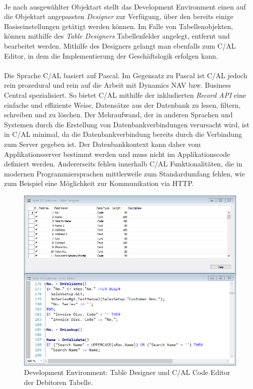 \paragraph{}
Je nach ausgewählter Objektart stellt das Development Environment einen auf die Objektart angepassten \textit{Designer} zur Verfügung, über den bereits einige Basiseinstellungen getätigt werden können. Im Falle von Tabellenobjekten, können mithilfe des \textit{Table Designers} Tabellenfelder angelegt, entfernt und bearbeitet werden. Mithilfe des Designers gelangt man ebenfalls zum C/AL Editor, in dem die Implementierung der Geschäftslogik erfolgen kann.


\paragraph{}
Die Sprache C/AL basiert auf Pascal. Im Gegensatz zu Pascal ist C/AL jedoch rein prozedural und rein auf die Arbeit mit Dynamics NAV bzw. Business Central spezialisiert. So bietet C/AL mithilfe der inkludierten \textit{Record API} eine einfache und effiziente Weise, Datensätze aus der Datenbank zu lesen, filtern, schreiben und zu löschen. Der Mehraufwand, der in anderen Sprachen und Systemen durch die Erstellung von Datenbankverbindungen verursacht wird, ist in C/AL minimal, da die Datenbankverbindung bereits durch die Verbindung zum Server gegeben ist. Der Datenbankkontext kann daher vom Applikationsserver bestimmt werden und muss nicht im Applikationscode definiert werden. Andererseits fehlen innerhalb C/AL Funktionalitäten, die in modernen Programmiersprachen mittlerweile zum Standardumfang fehlen, wie zum Beispiel eine Möglichkeit zur Kommunikation via HTTP.

\begin{figure}[H]
	\centering
	\includegraphics[width=145mm]{images/TableDesigner}
	\caption{Development Environment: Table Designer und C/AL Code Editor der Debitoren Tabelle.}
	\label{fig:TableDesignerCodeEditor}
\end{figure}


